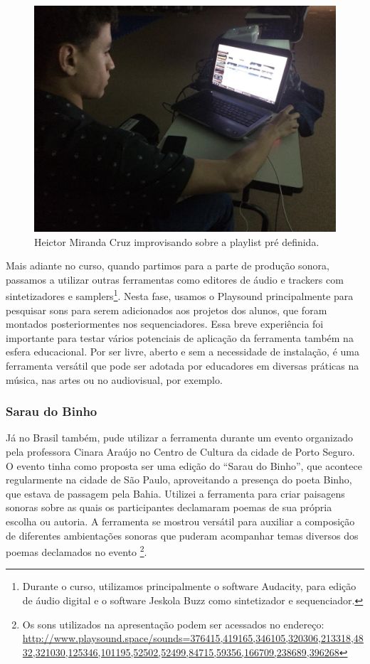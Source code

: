 \begin{figure}

\includegraphics[width=1\textwidth]{pictures/cap4/heitor_ufsb}
\caption{\label{psufsb2}Heictor Miranda Cruz improvisando sobre a playlist pré definida.}

\label{fig:psufsb2}
\end{figure}

Mais adiante no curso, quando partimos para a parte de produção sonora, passamos a utilizar outras ferramentas como editores de áudio e trackers com sintetizadores e samplers\footnote{Durante o curso, utilizamos principalmente o software Audacity, para edição de áudio digital e o software Jeskola Buzz como sintetizador e sequenciador.}. Nesta fase, usamos o Playsound principalmente para pesquisar sons para serem adicionados aos projetos dos alunos, que foram montados posteriormentes nos sequenciadores. Essa breve experiência foi importante para testar vários potenciais de aplicação da ferramenta também na esfera educacional. Por ser livre, aberto e sem a necessidade de instalação, é uma ferramenta versátil que pode ser adotada por educadores em diversas práticas na música, nas artes ou no audiovisual, por exemplo.

\subsubsection{Sarau do Binho}

Já no Brasil também, pude utilizar a ferramenta durante um evento organizado pela professora Cinara Araújo no Centro de Cultura da cidade de Porto Seguro. O evento tinha como proposta ser uma edição do ``Sarau do Binho'', que acontece regularmente na cidade de São Paulo, aproveitando a presença do poeta Binho, que estava de passagem pela Bahia. Utilizei a ferramenta para criar paisagens sonoras sobre as quais os participantes declamaram poemas de sua própria escolha ou autoria. A ferramenta se mostrou versátil para auxiliar a composição de diferentes ambientações sonoras que puderam acompanhar temas diversos dos poemas declamados no evento \footnote{Os sons utilizados na apresentação podem ser acessados no endereço: \url{http://www.playsound.space/sounds=376415,419165,346105,320306,213318,4832,321030,125346,101195,52502,52499,84715,59356,166709,238689,396268}}.


